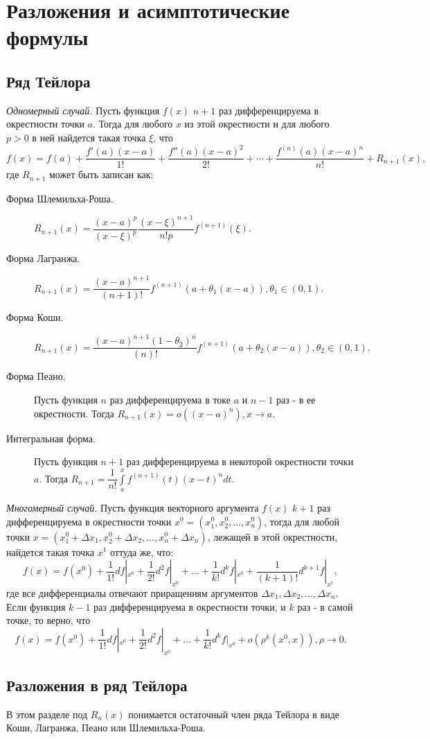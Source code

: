\documentclass[a4paper,12pt]{scrartcl}
\begin{document}
\section{Разложения и асимптотические формулы}
\subsection{Ряд Тейлора}
\emph{Одномерный случай.} Пусть функция $f(x)$ $n+1$ раз дифференцируема в окрестности точки $a$. Тогда для любого $x$ из этой окрестности и для любого $p > 0$ в ней найдется такая точка $\xi$, что $$f(x) = f(a) + \dfrac{f'(a)(x-a)}{1!} + \dfrac{f''(a)(x-a)^2}{2!}+ \cdots + \dfrac{f^{(n)}(a)(x-a)^n}{n!} + R_{n+1}(x),$$ где $R_{n+1}$ может быть записан как:
\begin{description}
 \item[Форма Шлемильха-Роша.] $R_{n+1}(x) = \dfrac{(x-a)^p}{(x-\xi)^p}\dfrac{(x-\xi)^{n+1}}{n!p}f^{(n+1)}(\xi)$.
 \item[Форма Лагранжа.] $R_{n+1}(x) = \dfrac{(x-a)^{n+1}}{(n+1)!}f^{(n+1)}(a + \theta_1(x-a)), \theta_1 \in (0,1).$
\item[Форма Коши.] $R_{n+1}(x) = \dfrac{(x-a)^{n+1}(1-\theta_2)^n}{(n)!}f^{(n+1)}(a + \theta_2(x-a)), \theta_2 \in (0,1).$
\item[Форма Пеано.] Пусть функция $n$ раз дифференцируема в токе $a$ и $n-1$ раз - в ее окрестности. Тогда $R_{n+1}(x) = o((x-a)^n), x\to a$.
\item[Интегральная форма.] Пусть функция $n+1$ раз дифференцируема в некоторой окрестности точки $a$. Тогда $R_{n+1} = \dfrac{1}{n!}\int\limits_{a}^{x}f^{(n+1)}(t)(x-t)^ndt.$
\end{description}
\emph{Многомерный случай.} Пусть функция векторного аргумента $f(x)$ $k+1$ раз дифференцируема в окрестности точки $x^0 = (x^0_1,x^0_2,\ldots,x^0_n)$, тогда для любой точки $x = (x^0_1 + \Delta x_1,x^0_2 +\Delta x_2,\ldots,x^0_n + \Delta x_n)$, лежащей в этой окрестности, найдется такая точка $x^1$ оттуда же, что:
$$f(x) = f(x^0) + \dfrac{1}{1!}df|_{x^0} + \dfrac{1}{2!}d^2f|_{x^0} + \ldots + \dfrac{1}{k!}d^kf|_{x^0} + \dfrac{1}{(k+1)!}d^{k+1}f|_{x^1},$$ где все дифференциалы отвечают приращениям аргументов $\Delta x_1, \Delta x_2, \ldots, \Delta x_n$.
Если функция $k-1$ раз дифференцируема в окрестности точки, и $k$ раз - в самой точке, то верно, что
$$f(x) = f(x^0) + \dfrac{1}{1!}df|_{x^0} + \dfrac{1}{2!}d^2f|_{x^0} + \ldots + \dfrac{1}{k!}d^kf|_{x^0} + o(\rho^k(x^0,x)),\rho \to 0.$$
\subsection{Разложения в ряд Тейлора}
В этом разделе под $R_{n}(x)$ понимается остаточный член ряда Тейлора в виде Коши, Лагранжа, Пеано или Шлемильха-Роша.
\end{document}
